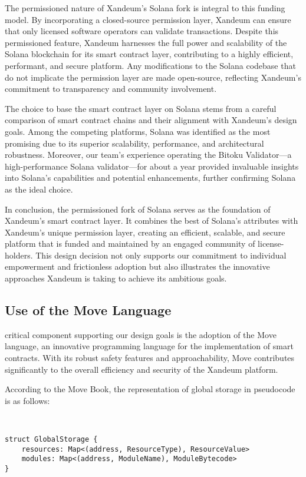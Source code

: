 \documentclass[11pt]{article}   	%
\begin{document}
The permissioned nature of Xandeum's Solana fork is integral to this funding model. By incorporating a closed-source permission layer, Xandeum can ensure that only licensed software operators can validate transactions. Despite this permissioned feature, Xandeum harnesses the full power and scalability of the Solana blockchain for its smart contract layer, contributing to a highly efficient, performant, and secure platform. Any modifications to the Solana codebase that do not implicate the permission layer are made open-source, reflecting Xandeum's commitment to transparency and community involvement.

The choice to base the smart contract layer on Solana stems from a careful comparison of smart contract chains and their alignment with Xandeum's design goals. Among the competing platforms, Solana was identified as the most promising due to its superior scalability, performance, and architectural robustness. Moreover, our team's experience operating the Bitoku Validator—a high-performance Solana validator—for about a year provided invaluable insights into Solana's capabilities and potential enhancements, further confirming Solana as the ideal choice.

In conclusion, the permissioned fork of Solana serves as the foundation of Xandeum's smart contract layer. It combines the best of Solana's attributes with Xandeum's unique permission layer, creating an efficient, scalable, and secure platform that is funded and maintained by an engaged community of license-holders. This design decision not only supports our commitment to individual empowerment and frictionless adoption but also illustrates the innovative approaches Xandeum is taking to achieve its ambitious goals.

\subsection{Use of the Move Language}
 critical component supporting our design goals is the adoption of the Move language, an innovative programming language for the implementation of smart contracts. With its robust safety features and approachability, Move contributes significantly to the overall efficiency and security of the Xandeum platform.

According to the Move Book, the representation of global storage in pseudocode is as follows:

\ \\
\begin{lstlisting}[caption=Global Storage in Move]
struct GlobalStorage {
    resources: Map<(address, ResourceType), ResourceValue>
    modules: Map<(address, ModuleName), ModuleBytecode>
}
\end{lstlisting}
\ \\
\end{document}
